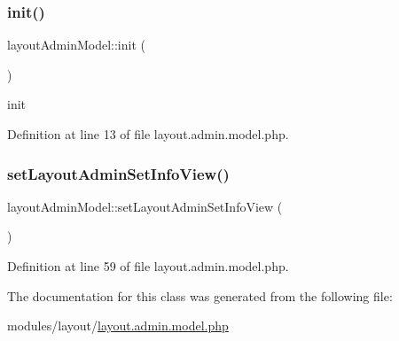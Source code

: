 \subsubsection{\texorpdfstring{init()}{init()}}
{\footnotesize\ttfamily layout\+Admin\+Model\+::init (\begin{DoxyParamCaption}{ }\end{DoxyParamCaption})}

init 

Definition at line 13 of file layout.\+admin.\+model.\+php.

\mbox{\label{classlayoutAdminModel_a5d53a19d62ff5fcbd2cc604e3d6a8e29}} 
\subsubsection{\texorpdfstring{set\+Layout\+Admin\+Set\+Info\+View()}{setLayoutAdminSetInfoView()}}
{\footnotesize\ttfamily layout\+Admin\+Model\+::set\+Layout\+Admin\+Set\+Info\+View (\begin{DoxyParamCaption}{ }\end{DoxyParamCaption})}



Definition at line 59 of file layout.\+admin.\+model.\+php.



The documentation for this class was generated from the following file\+:\begin{DoxyCompactItemize}
\item 
modules/layout/\hyperlink{layout_8admin_8model_8php}{layout.\+admin.\+model.\+php}\end{DoxyCompactItemize}
